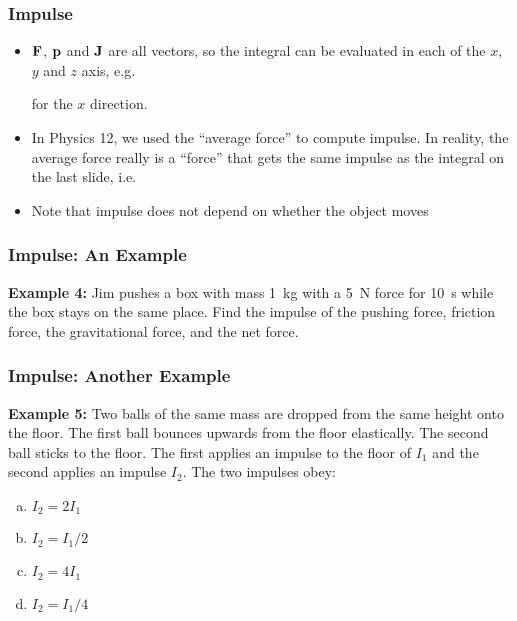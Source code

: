 \documentclass[12pt,compress,aspectratio=169]{beamer}
\newcommand{\mb}[1]{\ensuremath\mathbf{#1}}
\begin{document}
\begin{frame}
  \frametitle{Impulse}
  \begin{itemize}
  \item $\mb{F}$, $\mb{p}$ and $\mb{J}$ are all vectors, so the integral can
    be evaluated in each of the $x$, $y$ and $z$ axis, e.g.

    
    \vspace{-.2in}for the $x$ direction.
  \item In Physics 12, we used the ``average force'' to compute
    impulse. In reality, the average force really is a ``force'' that gets the
    same impulse as the integral on the last slide, i.e.

    \vspace{-.35in}{\Large
      \begin{displaymath}
        \mb{F}_\mathrm{ave}=\frac{\int_{t_1}^{t_2}\mb{F}dt}{t_2-t_1}
        =\frac{\mb{J}}{\Delta t}
      \end{displaymath}
     }
  \item Note that impulse does not depend on whether the object moves
  \end{itemize}
\end{frame}

\begin{frame}
  \frametitle{Impulse: An Example}
  \textbf{Example 4:} Jim pushes a box with mass \SI{1}{kg} with a \SI{5}{N}
  force for \SI{10}{\s} while the box stays on the same place. Find the impulse
  of the pushing force, friction force, the gravitational force, and the net
  force.
\end{frame}

\begin{frame}
  \frametitle{Impulse: Another Example}
  \textbf{Example 5:} Two balls of the same mass are dropped from the same
  height onto the floor. The first ball bounces upwards from the floor
  elastically. The second ball sticks to the floor. The first applies an
  impulse to the floor of $I_1$ and the second applies an impulse $I_2$. The
  two impulses obey:
  \begin{enumerate}[(a)]
  \item $I_2=2I_1$
  \item $I_2=I_1/2$
  \item $I_2=4I_1$
  \item $I_2=I_1/4$
  \end{enumerate}
\end{frame}
\end{document}
